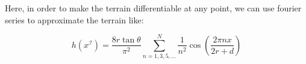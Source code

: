 \documentclass[11pt]{article}
\begin{document}
Here, in order to make the terrain differentiable at any point, we can use fourier series to approximate the terrain like:

\[
h(x^\mathcal{I}) = \frac{8 r \tan\theta}{\pi^2} \sum_{n=1,3,5,\dots}^{N} \frac{1}{n^2} \cos\left( \frac{2\pi n x}{2r + d} \right)
\]


\end{document}
